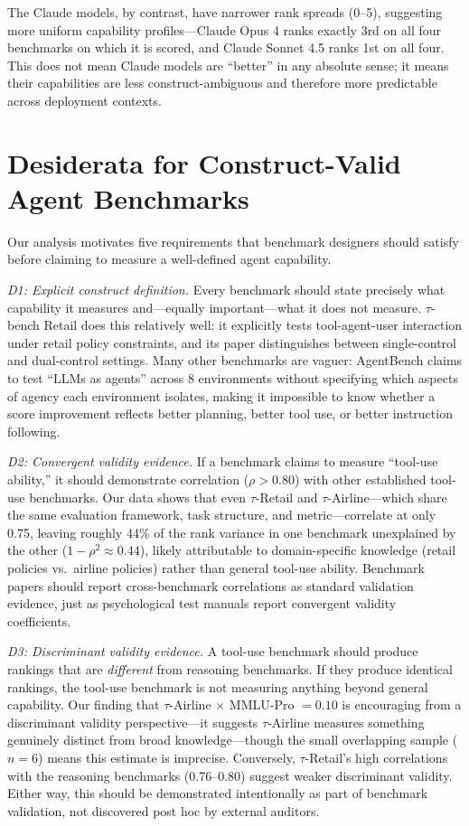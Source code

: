 \documentclass[sigconf]{acmart}
\begin{document}
The Claude models, by contrast, have narrower rank spreads (0--5), suggesting more uniform capability profiles---Claude Opus 4 ranks exactly 3rd on all four benchmarks on which it is scored, and Claude Sonnet 4.5 ranks 1st on all four. This does not mean Claude models are ``better'' in any absolute sense; it means their capabilities are less construct-ambiguous and therefore more predictable across deployment contexts.

\section{Desiderata for Construct-Valid Agent Benchmarks}\label{sec:desiderata}
Our analysis motivates five requirements that benchmark designers should satisfy before claiming to measure a well-defined agent capability.

\textit{D1: Explicit construct definition.} Every benchmark should state precisely what capability it measures and---equally important---what it does not measure. $\tau$-bench Retail does this relatively well: it explicitly tests tool-agent-user interaction under retail policy constraints, and its paper distinguishes between single-control and dual-control settings. Many other benchmarks are vaguer: AgentBench claims to test ``LLMs as agents'' across 8 environments without specifying which aspects of agency each environment isolates, making it impossible to know whether a score improvement reflects better planning, better tool use, or better instruction following.

\textit{D2: Convergent validity evidence.} If a benchmark claims to measure ``tool-use ability,'' it should demonstrate correlation ($\rho > 0.80$) with other established tool-use benchmarks. Our data shows that even $\tau$-Retail and $\tau$-Airline---which share the same evaluation framework, task structure, and metric---correlate at only 0.75, leaving roughly 44\% of the rank variance in one benchmark unexplained by the other ($1 - \rho^2 \approx 0.44$), likely attributable to domain-specific knowledge (retail policies vs.\ airline policies) rather than general tool-use ability. Benchmark papers should report cross-benchmark correlations as standard validation evidence, just as psychological test manuals report convergent validity coefficients.

\textit{D3: Discriminant validity evidence.} A tool-use benchmark should produce rankings that are \emph{different} from reasoning benchmarks. If they produce identical rankings, the tool-use benchmark is not measuring anything beyond general capability. Our finding that $\tau$-Airline $\times$ MMLU-Pro $= 0.10$ is encouraging from a discriminant validity perspective---it suggests $\tau$-Airline measures something genuinely distinct from broad knowledge---though the small overlapping sample ($n = 6$) means this estimate is imprecise. Conversely, $\tau$-Retail's high correlations with the reasoning benchmarks (0.76--0.80) suggest weaker discriminant validity. Either way, this should be demonstrated intentionally as part of benchmark validation, not discovered post hoc by external auditors.
\end{document}
